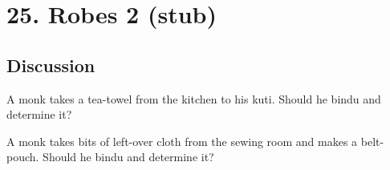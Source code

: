 \chapter{25. Robes 2 (stub)}
\renewcommand*{\theChapterTitle}{25. Robes 2}

\section*{Discussion}

A monk takes a tea-towel from the kitchen to his kuti. Should he bindu and
determine it?

A monk takes bits of left-over cloth from the sewing room and makes a
belt-pouch. Should he bindu and determine it?

